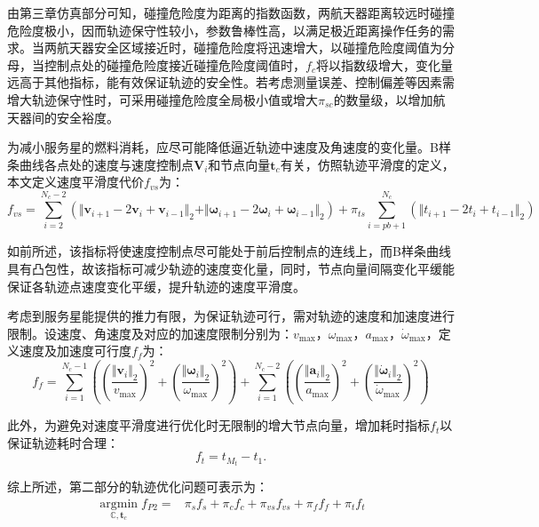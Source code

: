 \documentclass[lang=chs, degree=master, blindreview=false, winfonts=true]{yanputhesis}
\begin{document}
由第三章仿真部分可知，碰撞危险度为距离的指数函数，两航天器距离较远时碰撞危险度极小，因而轨迹保守性较小，参数鲁棒性高，以满足极近距离操作任务的需求。当两航天器安全区域接近时，碰撞危险度将迅速增大，以碰撞危险度阈值为分母，当控制点处的碰撞危险度接近碰撞危险度阈值时，$f_{c}$将以指数级增大，变化量远高于其他指标，能有效保证轨迹的安全性。若考虑测量误差、控制偏差等因素需增大轨迹保守性时，可采用碰撞危险度全局极小值或增大$\pi_{sc}$的数量级，以增加航天器间的安全裕度。

为减小服务星的燃料消耗，应尽可能降低逼近轨迹中速度及角速度的变化量。B样条曲线各点处的速度与速度控制点$\boldsymbol{V}_i$和节点向量$\boldsymbol{t}_{c}$有关，仿照轨迹平滑度的定义，本文定义速度平滑度代价$f_{vs}$为：
\begin{equation}
	f_{vs}=\sum_{i=2}^{N_c-2}(\Vert\boldsymbol{v}_{i+1}-2 \boldsymbol{v}_i+\boldsymbol{v}_{i-1}\Vert_2+\Vert\boldsymbol{\omega}_{i+1}-2 \boldsymbol{\omega}_i+\boldsymbol{\omega}_{i-1}\Vert_2)+\pi_{ts}\sum_{i=pb+1}^{N_c}(\Vert t_{i+1}-2 t_i+t_{i-1}\Vert_2)
\end{equation}

如前所述，该指标将使速度控制点尽可能处于前后控制点的连线上，而B样条曲线具有凸包性，故该指标可减少轨迹的速度变化量，同时，节点向量间隔变化平缓能保证各轨迹点速度变化平缓，提升轨迹的速度平滑度。

考虑到服务星能提供的推力有限，为保证轨迹可行，需对轨迹的速度和加速度进行限制。设速度、角速度及对应的加速度限制分别为：$v_{\max}$，$\omega_{\max}$，$a_{\max}$，$\dot{\omega}_{\max}$，定义速度及加速度可行度$f_{f}$为：
\begin{equation}
	f_{f}=\sum_{i=1}^{N_c-1}\left(\left(\frac{\Vert\boldsymbol{v}_{i}\Vert_2}{v_{\max}}\right)^{2}+\left(\frac{\Vert\boldsymbol{\omega}_{i}\Vert_2}{\omega_{\max}}\right)^{2}\right)+\sum_{i=1}^{N_c-2}\left(\left(\frac{\Vert\boldsymbol{a}_{i}\Vert_2}{a_{\max}}\right)^{2}+\left(\frac{\Vert\boldsymbol{\dot{\omega}}_{i}\Vert_2}{\dot{\omega}_{\max}}\right)^{2}\right)
\end{equation}

此外，为避免对速度平滑度进行优化时无限制的增大节点向量，增加耗时指标$f_{t}$以保证轨迹耗时合理：
\begin{equation}
	f_{t}=t_{M_{t}}-t_{1}.
\end{equation}

综上所述，第二部分的轨迹优化问题可表示为：
\begin{equation}
	\begin{aligned}
		\label{proximity_phase2}
		\mathop{\arg\min}\limits_{\mathbb{C},\boldsymbol{t}_{c}} f_{P2}=&\pi_{s}f_{s}+\pi_{c}f_{c}+\pi_{vs}f_{vs}+\pi_{f}f_{f}+\pi_{t}f_{t}
	\end{aligned}
\end{equation}
\end{document}
